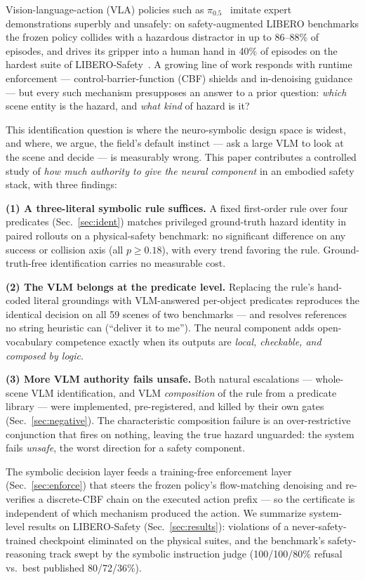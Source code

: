 \documentclass[conference]{IEEEtran}
\begin{document}
Vision-language-action (VLA) policies such as $\pi_{0.5}$~\cite{pi05} imitate expert demonstrations superbly and unsafely: on safety-augmented LIBERO benchmarks the frozen policy collides with a hazardous distractor in up to 86--88\% of episodes, and drives its gripper into a human hand in 40\% of episodes on the hardest suite of LIBERO-Safety~\cite{liberosafety}. A growing line of work responds with runtime enforcement --- control-barrier-function (CBF) shields and in-denoising guidance~\cite{sota2607,aegis,safediffuser} --- but every such mechanism presupposes an answer to a prior question: \emph{which} scene entity is the hazard, and \emph{what kind} of hazard is it?

This identification question is where the neuro-symbolic design space is widest, and where, we argue, the field's default instinct --- ask a large VLM to look at the scene and decide --- is measurably wrong. This paper contributes a controlled study of \emph{how much authority to give the neural component} in an embodied safety stack, with three findings:

\textbf{(1) A three-literal symbolic rule suffices.} A fixed first-order rule over four predicates (Sec.~\ref{sec:ident}) matches privileged ground-truth hazard identity in paired rollouts on a physical-safety benchmark: no significant difference on any success or collision axis (all $p\ge0.18$), with every trend favoring the rule. Ground-truth-free identification carries no measurable cost.

\textbf{(2) The VLM belongs at the predicate level.} Replacing the rule's hand-coded literal groundings with VLM-answered per-object predicates reproduces the identical decision on all 59 scenes of two benchmarks --- and resolves references no string heuristic can (``deliver it to me''). The neural component adds open-vocabulary competence exactly when its outputs are \emph{local, checkable, and composed by logic}.

\textbf{(3) More VLM authority fails unsafe.} Both natural escalations --- whole-scene VLM identification, and VLM \emph{composition} of the rule from a predicate library --- were implemented, pre-registered, and killed by their own gates (Sec.~\ref{sec:negative}). The characteristic composition failure is an over-restrictive conjunction that fires on nothing, leaving the true hazard unguarded: the system fails \emph{unsafe}, the worst direction for a safety component.

The symbolic decision layer feeds a training-free enforcement layer (Sec.~\ref{sec:enforce}) that steers the frozen policy's flow-matching denoising and re-verifies a discrete-CBF chain on the executed action prefix --- so the certificate is independent of which mechanism produced the action. We summarize system-level results on LIBERO-Safety (Sec.~\ref{sec:results}): violations of a never-safety-trained checkpoint eliminated on the physical suites, and the benchmark's safety-reasoning track swept by the symbolic instruction judge (100/100/80\% refusal vs.\ best published 80/72/36\%).
\end{document}
